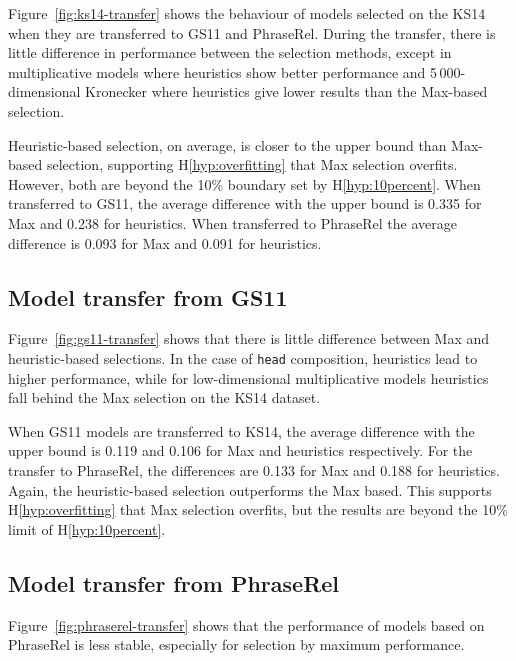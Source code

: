 Figure~\ref{fig:ks14-transfer} shows the behaviour of models selected on the KS14 when they are transferred to GS11 and PhraseRel. During the transfer, there is little difference in performance between the selection methods, except in multiplicative models where heuristics show better performance and 5\,000-dimensional Kronecker where heuristics give lower results than the Max-based selection.

Heuristic-based selection, on average, is closer to the upper bound than Max-based selection, supporting H\ref{hyp:overfitting} that Max selection overfits. However, both are beyond the 10\% boundary set by H\ref{hyp:10percent}. When transferred to GS11, the average difference with the upper bound is 0.335 for Max and 0.238 for heuristics. When transferred to PhraseRel the average difference is 0.093 for Max and 0.091 for heuristics.

\subsection{Model transfer from GS11}
\label{sec:from-gs11}



Figure~\ref{fig:gs11-transfer} shows that there is little difference between Max and heuristic-based selections. In the case of \texttt{head} composition, heuristics lead to higher performance, while for low-dimensional multiplicative models heuristics fall behind the Max selection on the KS14 dataset.

When GS11 models are transferred to KS14, the average difference with the upper bound is 0.119 and 0.106 for Max and heuristics respectively. For the transfer to PhraseRel, the differences are 0.133 for Max and 0.188 for heuristics. Again, the heuristic-based selection outperforms the Max based. This supports H\ref{hyp:overfitting} that Max selection overfits, but the results are beyond the 10\% limit of H\ref{hyp:10percent}.

\subsection{Model transfer from PhraseRel}
\label{sec:from-phraserel}



Figure~\ref{fig:phraserel-transfer} shows that the performance of models based on PhraseRel is less stable, especially for selection by maximum performance.

